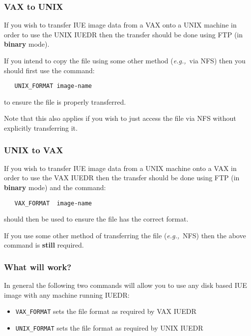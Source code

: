 \subsubsection{VAX to UNIX}

If you wish to transfer IUE image data from a VAX onto a UNIX machine
in order to use the UNIX IUEDR then the transfer should be done using
FTP (in {\bf binary} mode).

If you intend to copy the file using some other method ({\it{e.g.,}}\ via NFS)
then you should first use the command:

\begin{verbatim}
   UNIX_FORMAT image-name
\end{verbatim}

to ensure the file is properly transferred.

Note that this also applies if you wish to just access the file
via NFS without explicitly transferring it.

\subsubsection{UNIX to VAX}

If you wish to transfer IUE image data from a UNIX machine onto a VAX
in order to use the VAX IUEDR then the transfer should be done using
FTP (in {\bf binary} mode) and the command:

\begin{verbatim}
   VAX_FORMAT  image-name
\end{verbatim}

should then be used to ensure the file has the correct format.

If you use some other method of transferring the file ({\it{e.g.,}}\ NFS) then
the above command is {\bf still} required.

\subsubsection{What will work?}

In general the following two commands will allow you to use any disk
based IUE image with any machine running IUEDR:

\begin{itemize}
   \item {\tt VAX\_FORMAT} sets the file format as required by VAX IUEDR
   \item {\tt UNIX\_FORMAT} sets the file format as required by UNIX IUEDR
\end{itemize}

